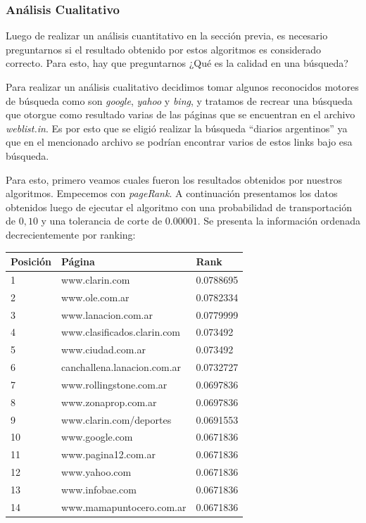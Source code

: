 \subsubsection{Análisis Cualitativo}
Luego de realizar un análisis cuantitativo en la sección previa, es necesario preguntarnos si el resultado obtenido por estos algoritmos es considerado correcto. 
Para esto, hay que preguntarnos ¿Qué es la calidad en una búsqueda? 
\par 
Para realizar un análisis cualitativo decidimos tomar algunos reconocidos motores de búsqueda como son \textit{google}, \textit{yahoo} y \textit{bing}, y tratamos de recrear una búsqueda que otorgue como resultado varias de las páginas que se encuentran en el archivo \textit{weblist.in}. Es por esto que se eligió realizar la búsqueda ``diarios argentinos'' ya que en el mencionado archivo se podrían encontrar varios de estos links bajo esa búsqueda.
\par 
Para esto, primero veamos cuales fueron los resultados obtenidos por nuestros algoritmos. Empecemos con \textit{pageRank}. A continuación presentamos los datos obtenidos luego de ejecutar el algoritmo con una probabilidad de transportación de $0,10$ y una tolerancia de corte de $0.00001$. Se presenta la información ordenada decrecientemente por ranking:

\begin{center}
    \begin{tabular}{| l | l | l |}
    \hline
    Posición & Página & Rank  \\ \hline
    
	1 & www.clarin.com & 0.0788695 \\ \hline
	2 & www.ole.com.ar & 0.0782334 \\ \hline
	3 & www.lanacion.com.ar & 0.0779999 \\ \hline
	4 & www.clasificados.clarin.com & 0.073492 \\ \hline
	5 & www.ciudad.com.ar & 0.073492 \\ \hline
	6 & canchallena.lanacion.com.ar & 0.0732727 \\ \hline
	7 & www.rollingstone.com.ar & 0.0697836 \\ \hline
	8 & www.zonaprop.com.ar & 0.0697836 \\ \hline
	9 & www.clarin.com/deportes & 0.0691553 \\ \hline
	10 & www.google.com & 0.0671836  \\ \hline
	11 & www.pagina12.com.ar & 0.0671836	\\ \hline		
	12 & www.yahoo.com & 0.0671836 \\ \hline
	13 & www.infobae.com & 0.0671836 \\ \hline
	14 & www.mamapuntocero.com.ar & 0.0671836 \\ \hline   
    \end{tabular}
\end{center}

